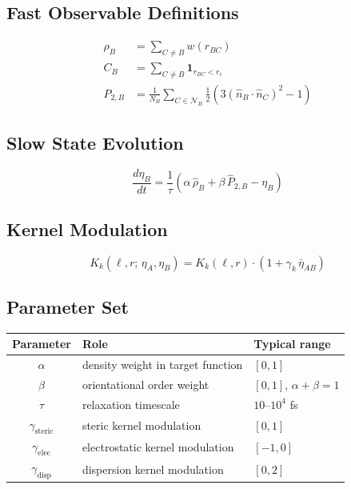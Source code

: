 \documentclass[11pt]{article}
\begin{document}
\subsection{Fast Observable Definitions}

\begin{align}
    \rho_B &= \sum_{C \neq B} w(r_{BC}) \\[4pt]
    C_B &= \sum_{C \neq B} \mathbf{1}_{r_{BC} < r_c} \\[4pt]
    P_{2,B} &= \frac{1}{N_B} \sum_{C \in \mathcal{N}_B}
        \frac{1}{2}\left(3(\hat{n}_B \cdot \hat{n}_C)^2 - 1\right)
\end{align}

\subsection{Slow State Evolution}

\begin{equation}
    \frac{d\eta_B}{dt}
    = \frac{1}{\tau}\left(
        \alpha\, \hat{\rho}_B + \beta\, \hat{P}_{2,B} - \eta_B
    \right)
\end{equation}

\subsection{Kernel Modulation}

\begin{equation}
    K_k(\ell, r;\, \eta_A, \eta_B)
    = K_k(\ell, r) \cdot \left(1 + \gamma_k\, \bar{\eta}_{AB}\right)
\end{equation}

\subsection{Parameter Set}

\begin{center}
\begin{tabular}{cll}
    \textbf{Parameter} & \textbf{Role} & \textbf{Typical range} \\
    \hline
    $\alpha$ & density weight in target function & $[0, 1]$ \\
    $\beta$ & orientational order weight & $[0, 1]$,\; $\alpha + \beta = 1$ \\
    $\tau$ & relaxation timescale & $10$--$10^4$ fs \\
    $\gamma_{\mathrm{steric}}$ & steric kernel modulation & $[0, 1]$ \\
    $\gamma_{\mathrm{elec}}$ & electrostatic kernel modulation & $[-1, 0]$ \\
    $\gamma_{\mathrm{disp}}$ & dispersion kernel modulation & $[0, 2]$ \\
\end{tabular}
\end{center}
\end{document}
